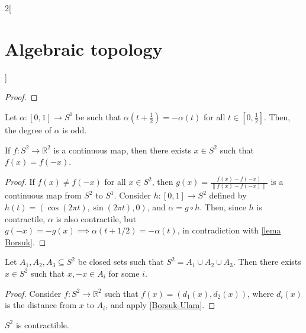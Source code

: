 \documentclass[../../../main_math.tex]{subfiles}
\begin{document}
\begin{multicols}{2}[\section{Algebraic topology}]
\begin{proof}
  \end{proof}

  \begin{lemma} \label{lema Borsuk}
    Let $\alpha:[0,1]\to S^1$ be such that $\alpha(t+\frac{1}{2})=-\alpha(t)$ for all $t\in[0,\frac{1}{2}]$. Then, the degree of $\alpha$ is odd.
  \end{lemma}

  \begin{theorem}
    \label{Borsuk-Ulam}
    If $f:S^2 \to \mathbb{R}^2$ is a continuous map, then there exists $x\in S^2$ such that $f(x)=f(-x)$.
  \end{theorem}

  \begin{proof}
    If $f(x)\neq f(-x)$ for all $x\in S^2$, then $g(x)=\frac{f(x)-f(-x)}{\|f(x)-f(-x)\|}$ is a continuous map from $S^2$ to $S^1$. Consider $h:[0,1] \to S^2$ defined by $h(t)=(\cos(2\pi t), \sin(2\pi t), 0)$, and $\alpha = g \circ h$. Then, since $h$ is contractile, $\alpha$ is also contractile, but $g(-x)=-g(x)\implies \alpha(t+1/2)=-\alpha(t)$, in contradiction with \cref{lema Borsuk}.
  \end{proof}

  \begin{corollary}
    Let $A_1, A_2, A_3\subseteq S^2$ be closed sets such that $S^2=A_1\cup A_2 \cup A_3$. Then there exists $x\in S^2$ such that $x,-x \in A_i$ for some $i$.
  \end{corollary}

  \begin{proof}
    Consider $f: S^2 \to \mathbb{R}^2$ such that $f(x)=(d_1(x), d_2(x))$, where $d_i(x)$ is the distance from $x$ to $A_i$, and apply \cref{Borsuk-Ulam}.
  \end{proof}

  \begin{proposition}
    $S^2$ is contractible.
  \end{proposition}


\end{multicols}
\end{document}
